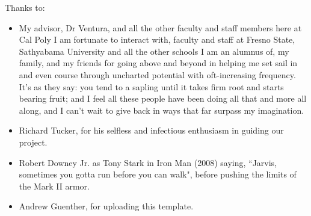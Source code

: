\noindent
Thanks to:
\begin{itemize}
    \item My advisor, Dr Ventura, and all the other faculty and staff members here at Cal Poly I am fortunate to interact with, faculty and staff at Fresno State, Sathyabama University and all the other schools I am an alumnus of, my family, and my friends for going above and beyond in helping me set sail in and even course through uncharted potential with oft-increasing frequency. It's as they say: you tend to a sapling until it takes firm root and starts bearing fruit; and I feel all these people have been doing all that and more all along, and I can't wait to give back in ways that far surpass my imagination.
    \item Richard Tucker, for his selfless and infectious enthusiasm in guiding our project.
    \item Robert Downey Jr. as Tony Stark in Iron Man (2008) saying, ``Jarvis, sometimes you gotta run before you can walk", before pushing the limits of the Mark II armor.
    \item Andrew Guenther, for uploading this template.
\end{itemize}
